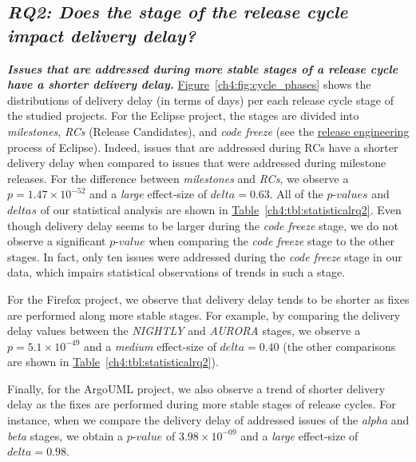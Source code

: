 \subsection*{\textbf{\textit{RQ2: Does the stage of the release cycle impact delivery delay?}}}

\noindent\textit{\textbf{Issues that are addressed during more stable stages of a
release cycle have a shorter delivery delay.}}
\hyperref[ch4:fig:cycle_phases]{Figure}~\ref{ch4:fig:cycle_phases} shows the
distributions of delivery delay (in terms of days) per each release cycle
stage of the studied projects. For the Eclipse project, the stages are divided
into {\em milestones}, {\em RCs} (Release Candidates), and {\em code freeze}
(see the \hyperref[eclipse:releng]{release engineering} process of Eclipse). Indeed, issues that
are addressed during RCs have a shorter delivery delay when
compared to issues that were addressed during milestone releases. For the difference
between {\em milestones} and {\em RCs}, we observe a $p=1.47 \times 10^{-52}$ and a {\em
large} effect-size of $delta=0.63$. All of the $p$-$values$ and $deltas$ of our
statistical analysis are shown in
\hyperref[ch4:tbl:statisticalrq2]{Table}~\ref{ch4:tbl:statisticalrq2}. Even though
delivery delay seems to be larger during the {\em code freeze} stage, we do
not observe a significant $p$-$value$ when comparing the {\em code freeze} stage
to the other stages. In fact, only ten issues were addressed during the {\em code freeze}
stage in our data, which impairs statistical observations of trends in such a stage.

For the Firefox project, we observe that delivery delay tends to be
shorter as fixes are performed along more stable stages. For example, by
comparing the delivery delay values between the {\em NIGHTLY} and {\em
AURORA} stages, we observe a $p=5.1 \times 10^{-49}$ and a {\em medium}
effect-size of $delta = 0.40$ (the other comparisons are shown in
\hyperref[ch4:tbl:statisticalrq2]{Table}~\ref{ch4:tbl:statisticalrq2}).

Finally, for the ArgoUML project, we also observe a trend of shorter
delivery delay as the fixes are performed during more stable stages of release
cycles. For instance, when we compare the delivery delay of addressed issues of the {\em alpha}
and {\em beta} stages, we obtain a $p$-$value$ of $3.98 \times 10^{-09}$ and a {\em
large} effect-size of $delta = 0.98$.\\

